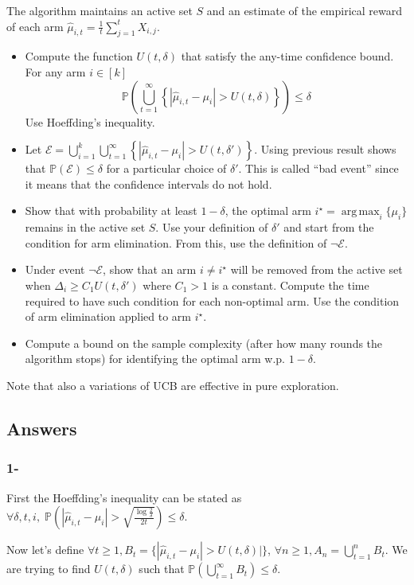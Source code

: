 \documentclass[a4paper]{article}
\newcommand{\wh}[1]{\widehat{#1}}
\DeclareMathOperator*{\argmax}{\arg\,\max}
\begin{document}
The algorithm maintains an active set $S$ and an estimate of the empirical reward of each arm $\wh\mu_{i,t} = \frac{1}{t} \sum_{j=1}^t X_{i,j}$.
\begin{itemize}
    \item Compute the function $U(t,\delta)$ that satisfy the any-time confidence bound. For any arm $i \in [k]$
          \[
              \mathbb{P}\left(\bigcup_{t=1}^{\infty} \left\{ | \wh{\mu}_{i,t} - \mu_i | > U(t,\delta)\right\} \right) \leq \delta
          \]
          Use Hoeffding's inequality.
    \item Let $\mathcal{E} = \bigcup_{i=1}^{k}\bigcup_{t=1}^{\infty} \left\{ | \wh{\mu}_{i,t} - \mu_i | > U(t,\delta')\right\}$. Using previous result shows that $\mathbb{P}(\mathcal{E}) \leq \delta$ for a particular choice of $\delta'$. This is called ``bad event'' since it means that the confidence intervals do not hold.
    \item Show that with probability at least $1-\delta$, the optimal arm $i^\star =\argmax_i \{\mu_{i}\}$ remains in the active set $S$. Use your definition of $\delta'$ and start from the condition for arm elimination. From this, use the definition of $\neg \mathcal{E}$.
    \item Under event $\neg \mathcal{E}$, show that an arm $i \neq i^\star$ will be removed from the active set when $\Delta_i \geq C_1 U(t, \delta')$ where $C_1 > 1$ is a constant. Compute the time required to have such condition for each non-optimal arm. Use the condition of arm elimination applied to arm $i^\star$.
    \item Compute a bound on the sample complexity (after how many rounds the algorithm stops) for identifying the optimal arm w.p. $1-\delta$.
\end{itemize}

Note that also a variations of UCB are effective in pure exploration.

\subsection*{Answers}
\subsubsection*{1-}

First the Hoeffding's inequality can be stated as
$\forall \delta, t, i, \; \mathbb{P}\left(|\wh{\mu}_{i,t} - \mu_i| > \sqrt{\frac{\log\frac{2}{\delta}}{2t}}\right) \le \delta$.

Now let's define $\forall t \ge 1, B_t = \{| \wh{\mu}_{i,t} - \mu_i | > U(t,\delta) |\}$, $\forall n \ge 1, A_n = \bigcup_{t=1}^n B_t$. We are trying
to find $U(t, \delta)$ such that $\mathbb{P}\left(\bigcup_{t=1}^{\infty} B_t \right) \leq \delta$.
\end{document}
